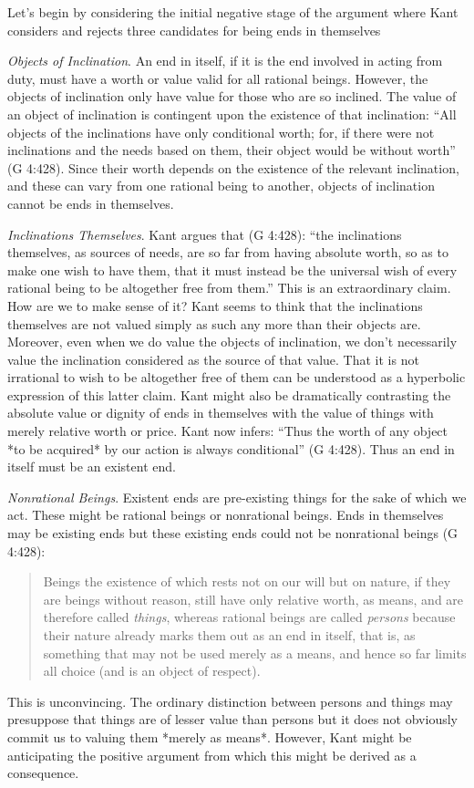 Let's begin by considering the initial negative stage of the argument where Kant considers and rejects three candidates for being ends in themselves

\emph{Objects of Inclination}. An end in itself, if it is the end involved in acting from duty, must have a worth or value valid for all rational beings. However, the objects of inclination only have value for those who are so inclined. The value of an object of inclination is contingent upon the existence of that inclination: ``All objects of the inclinations have only conditional worth; for, if there were not inclinations and the needs based on them, their object would be without worth'' (G 4:428). Since their worth depends on the existence of the relevant inclination, and these can vary from one rational being to another, objects of inclination cannot be ends in themselves. \change

\emph{Inclinations Themselves}. Kant argues that (G 4:428): ``the inclinations themselves, as sources of needs, are so far from having absolute worth, so as to make one wish to have them, that it must instead be the universal wish of every rational being to be altogether free from them.'' This is an extraordinary claim. How are we to make sense of it? Kant seems to think that the inclinations themselves are not valued simply as such any more than their objects are. Moreover, even when we do value the objects of inclination, we don’t necessarily value the inclination considered as the source of that value. That it is not irrational to wish to be altogether free of them can be understood as a hyperbolic expression of this latter claim. Kant might also be dramatically contrasting the absolute value or dignity of ends in themselves with the value of things with merely relative worth or price. Kant now infers: ``Thus the worth of any object *to be acquired* by our action is always conditional'' (G 4:428). Thus an end in itself must be an existent end. \change

\emph{Nonrational Beings}. Existent ends are pre-existing things for the sake of which we act. These might be rational beings or nonrational beings. Ends in themselves may be existing ends but these existing ends could not be nonrational beings (G 4:428):
\begin{quote}
    Beings the existence of which rests not on our will but on nature, if they are beings without reason, still have only relative worth, as means, and are therefore called \emph{things}, whereas rational beings are called \emph{persons} because their nature already marks them out as an end in itself, that is, as something that may not be used merely as a means, and hence so far limits all choice (and is an object of respect).
\end{quote}
This is unconvincing. The ordinary distinction between persons and things may presuppose that things are of lesser value than persons but it does not obviously commit us to valuing them *merely as means*. However, Kant might be anticipating the positive argument from which this might be derived as a consequence. \change

